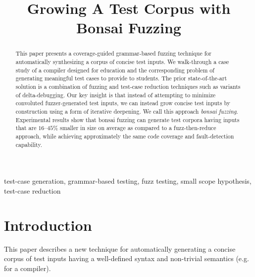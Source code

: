 \documentclass[conference]{IEEEtran}
\newcommand{\tech}{bonsai fuzzing} \newcommand{\Tech}{Bonsai fuzzing} \newcommand{\TECH}{Bonsai Fuzzing}
\begin{document}
\title{Growing A Test Corpus with \TECH{}
}
\author{
\and
{}
\and
{}
}

\maketitle

\begin{abstract}
This paper presents a coverage-guided grammar-based fuzzing technique for automatically synthesizing a corpus of concise test inputs. We walk-through a case study of a compiler designed for education and the corresponding problem of generating meaningful test cases to provide to students. The prior state-of-the-art solution is a combination of fuzzing and test-case reduction techniques such as variants of delta-debugging. Our key insight is that instead of attempting to minimize convoluted fuzzer-generated test inputs, we can instead grow concise test inputs {by construction} using a form of iterative deepening. We call this approach \emph{\tech{}}. Experimental results show that \tech{} can generate test corpora having inputs that are $16$--$45\%$ smaller in size on average as compared to a fuzz-then-reduce approach, while achieving approximately the same code coverage and fault-detection capability.
\end{abstract} 
\begin{IEEEkeywords}
test-case generation, grammar-based testing, fuzz testing, small scope hypothesis, test-case reduction
\end{IEEEkeywords}

\section{Introduction}
\label{sec:intro}


This paper describes a new technique for automatically generating a concise corpus of test inputs having a well-defined syntax and non-trivial semantics (e.g. for a compiler). 
\end{document}
